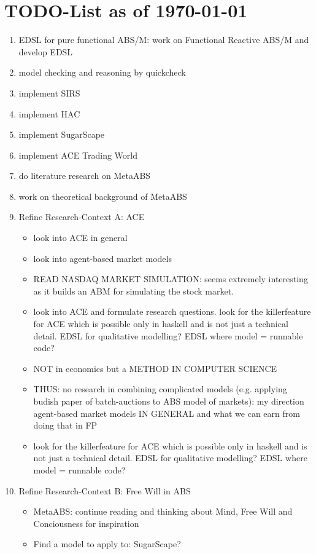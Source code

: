 \section{TODO-List as of \today}

\begin{enumerate}
  
\item EDSL for pure functional ABS/M: work on Functional Reactive ABS/M and develop EDSL
\item model checking and reasoning by quickcheck
\item implement SIRS
\item implement HAC
\item implement SugarScape
\item implement ACE Trading World
\item do literature research on MetaABS
\item work on theoretical background of MetaABS

\item Refine Research-Context A: ACE
	\begin{itemize}
    \item look into ACE in general
    \item look into agent-based market models
	\item READ NASDAQ MARKET SIMULATION: seems extremely interesting as it builds an ABM for simulating the stock market.
	\item look into ACE and formulate research questions. look for the killerfeature for ACE which is possible only in haskell and is not just a technical detail. EDSL for qualitative modelling? EDSL where model = runnable code?
	\item  NOT in economics but a METHOD IN COMPUTER SCIENCE
	\item THUS: no research in combining complicated models (e.g. applying budish paper of batch-auctions to ABS model of markets): my direction agent-based market models IN GENERAL and what we can earn from doing that in FP
	\item look for the killerfeature for ACE which is possible only in haskell and is not just a technical detail. EDSL for qualitative modelling? EDSL where model = runnable code?
	\end{itemize}
	 
\item Refine Research-Context B: Free Will in ABS
	\begin{itemize}
	\item MetaABS: continue reading and thinking about Mind, Free Will and Conciousness for inspiration
	\item Find a model to apply to: SugarScape?
	\end{itemize}


\end{enumerate}
